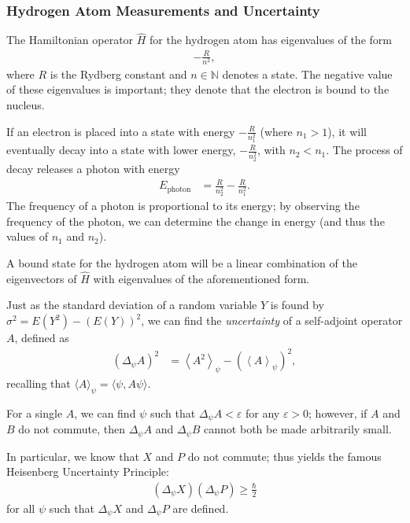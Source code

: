 \documentclass[10pt]{extarticle}
\newcommand{\N}{\mathbb{N}}
\theoremstyle{plain}
\theoremstyle{definition}
\theoremstyle{remark}
\renewcommand{\newline}{\hfill\break}
\begin{document}
  \subsubsection{Hydrogen Atom Measurements and Uncertainty}%
  The Hamiltonian operator $\hat{H}$ for the hydrogen atom has eigenvalues of the form
  \begin{align*}
    -\frac{R}{n^2},
  \end{align*}
  where $R$ is the Rydberg constant and $n\in \N$ denotes a state. The negative value of these eigenvalues is important; they denote that the electron is bound to the nucleus.\newline

  If an electron is placed into a state with energy $-\frac{R}{n_1^2}$ (where $n_1 > 1$), it will eventually decay into a state with lower energy, $-\frac{R}{n_2^2}$, with $n_2 < n_1$. The process of decay releases a photon with energy
  \begin{align*}
    E_{\text{photon}} &= \frac{R}{n_2^2} - \frac{R}{n_1^2}.
  \end{align*}
  The frequency of a photon is proportional to its energy; by observing the frequency of the photon, we can determine the change in energy (and thus the values of $n_1$ and $n_2$).\newline

  A bound state for the hydrogen atom will be a linear combination of the eigenvectors of $\hat{H}$ with eigenvalues of the aforementioned form.\newline

  Just as the standard deviation of a random variable $Y$ is found by $\sigma^2 = E(Y^2) - \left(E(Y)\right)^2$, we can find the \textit{uncertainty} of a self-adjoint operator $A$, defined as
  \begin{align*}
    \left(\Delta_{\psi}A\right)^2 &= \left\langle A^2\right\rangle_{\psi} - \left(\left\langle A\right\rangle_{\psi}\right)^2,
  \end{align*}
  recalling that $\langle A \rangle_{\psi} = \langle \psi,A\psi\rangle$.\newline

  For a single $A$, we can find $\psi$ such that $\Delta_{\psi}A < \varepsilon$ for any $\varepsilon > 0$; however, if $A$ and $B$ do not commute, then $\Delta_{\psi}A$ and $\Delta_{\psi}B$ cannot both be made arbitrarily small.\newline

  In particular, we know that $X$ and $P$ do not commute; thus yields the famous Heisenberg Uncertainty Principle:
  \begin{align*}
    \left(\Delta_{\psi}X\right)\left(\Delta_{\psi}P\right) \geq \frac{\hbar}{2}
  \end{align*}
  for all $\psi$ such that $\Delta_{\psi}X$ and $\Delta_{\psi}P$ are defined.
\end{document}
